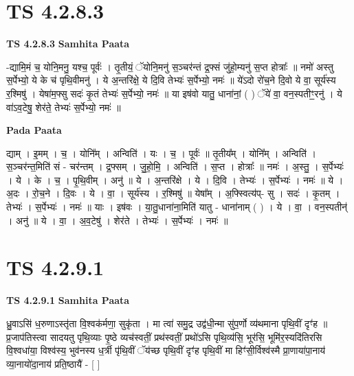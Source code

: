 \documentclass[17pt]{extarticle}
\begin{document}
\section*{ TS 4.2.8.3 }

\textbf{TS 4.2.8.3 } \newline
\textbf{Samhita Paata} \newline

-द्यामि॒मं च॒ योनि॒मनु॒ यश्च॒ पूर्वः॑ । तृ॒तीयं॒ ॅयोनि॒मनु॑ स॒ञ्चर॑न्तं द्र॒फ्सं जु॑हो॒म्यनु॑ स॒प्त होत्राः᳚ ॥ नमो॑ अस्तु स॒र्पेभ्यो॒ ये के च॑ पृथि॒वीमनु॑ । ये अ॒न्तरि॑क्षे॒ ये दि॒वि तेभ्यः॑ स॒र्पेभ्यो॒ नमः॑ ॥ ये॑ऽदो रो॑च॒ने दि॒वो ये वा॒ सूर्य॑स्य र॒श्मिषु॑ । येषा॑म॒फ्सु सदः॑ कृ॒तं तेभ्यः॑ स॒र्पेभ्यो॒ नमः॑ ॥ या इष॑वो यातु॒ धाना॑नां॒ ( ) ॅये॑ वा॒ वन॒स्पतीꣳ॒॒रनु॑ । ये वा॑ऽव॒टेषु॒ शेर॑ते॒ तेभ्यः॑ स॒र्पेभ्यो॒ नमः॑ ॥ \newline

\textbf{Pada Paata} \newline

द्याम् । इ॒मम् । च॒ । योनि᳚म् । अन्विति॑ । यः । च॒ । पूर्वः॑ ॥ तृ॒तीय᳚म् । योनि᳚म् । अन्विति॑ । स॒ञ्चर॑न्त॒मिति॑ सं - चर॑न्तम् । द्र॒फ्सम् । जु॒हो॒मि॒ । अन्विति॑ । स॒प्त । होत्राः᳚ ॥ नमः॑ । अ॒स्तु॒ । स॒र्पेभ्यः॑ । ये । के । च॒ । पृ॒थि॒वीम् । अनु॑ ॥ ये । अ॒न्तरि॑क्षे । ये । दि॒वि । तेभ्यः॑ । स॒र्पेभ्यः॑ । नमः॑ ॥ ये । अ॒दः । रो॒च॒ने । दि॒वः । ये । वा॒ । सूर्य॑स्य । र॒श्मिषु॑ ॥ येषा᳚म् । अ॒फ्स्वित्य॑प्- सु । सदः॑ । कृ॒तम् । तेभ्यः॑ । स॒र्पेभ्यः॑ । नमः॑ ॥ याः । इष॑वः । या॒तु॒धाना॑ना॒मिति॑ यातु - धाना॑नाम् ( ) । ये । वा॒ । वन॒स्पतीन्॑ । अनु॑ ॥ ये । वा॒ । अ॒व॒टेषु॑ । शेर॑ते । तेभ्यः॑ । स॒र्पेभ्यः॑ । नमः॑ ॥  \newline




\section*{ TS 4.2.9.1 }

\textbf{TS 4.2.9.1 } \newline
\textbf{Samhita Paata} \newline

ध्रु॒वाऽसि॑ ध॒रुणाऽस्तृ॑ता वि॒श्वक॑र्मणा॒ सुकृ॑ता । मा त्वा॑ समु॒द्र उद्व॑धी॒न्मा सु॑प॒र्णो व्य॑थमाना पृथि॒वीं दृꣳ॑ह ॥ प्र॒जाप॑तिस्त्वा सादयतु पृथि॒व्याः पृ॒ष्ठे व्यच॑स्वतीं॒ प्रथ॑स्वतीं॒ प्रथो॑ऽसि पृथि॒व्य॑सि॒ भूर॑सि॒ भूमि॑र॒स्यदि॑तिरसि वि॒श्वधा॑या॒ विश्व॑स्य॒ भुव॑नस्य ध॒र्त्री पृ॑थि॒वीं ॅय॑च्छ पृथि॒वीं दृꣳ॑ह पृथि॒वीं मा हिꣳ॑सी॒र्विश्व॑स्मै प्रा॒णाया॑पा॒नाय॑ व्या॒नायो॑दा॒नाय॑ प्रति॒ष्ठायै॑ - [  ] \newline
\end{document}
